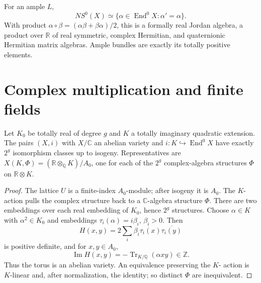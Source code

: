 \begin{proposition}
\label{mumford-prop-ns-jordan-structure}
For an ample $L$,
\[
NS^0(X)\simeq\{\alpha\in\operatorname{End}^0X:\alpha'=\alpha\}.
\]
With product $\alpha\circ\beta=(\alpha\beta+\beta\alpha)/2$, this is a
formally real Jordan algebra, a product over $\mathbb R$ of real symmetric,
complex Hermitian, and quaternionic Hermitian matrix algebras. Ample bundles
are exactly its totally positive elements.
\notready
\end{proposition}

\section{Complex multiplication and finite fields}
\label{mumford-IV22-source}

\begin{theorem}
\label{mumford-thm-cm-complex-classification}
Let $K_0$ be totally real of degree $g$ and $K$ a totally imaginary quadratic
extension. The pairs $(X,i)$ with $X/\mathbb C$ an abelian variety and
$i:K\hookrightarrow\operatorname{End}^0X$ have exactly $2^g$ isomorphism
classes up to isogeny. Representatives are
$X(K,\Phi)=(\mathbb R\otimes_{\mathbb Q}K)/A_0$, one for each of the
$2^g$ complex-algebra structures $\Phi$ on $\mathbb R\otimes K$.
\end{theorem}
\begin{proof}
The lattice $U$ is a finite-index $A_0$-module; after isogeny it is $A_0$.
The $K$-action pulls the complex structure back to a $\mathbb C$-algebra
structure $\Phi$. There are two embeddings over each real embedding of
$K_0$, hence $2^g$ structures. Choose $\alpha\in K$ with
$\alpha^2\in K_0$ and embeddings $\tau_i(\alpha)=i\beta_i$, $\beta_i>0$.
Then
\[
H(x,y)=2\sum_i\beta_i\tau_i(x)\overline{\tau_i(y)}
\]
is positive definite, and for $x,y\in A_0$,
\[
\operatorname{Im}H(x,y)=-\operatorname{Tr}_{K/\mathbb Q}(\alpha xy)\in\mathbb Z.
\]
Thus the torus is an abelian variety. An equivalence preserving the $K$-
action is $K$-linear and, after normalization, the identity; so distinct
$\Phi$ are inequivalent.
\end{proof}

